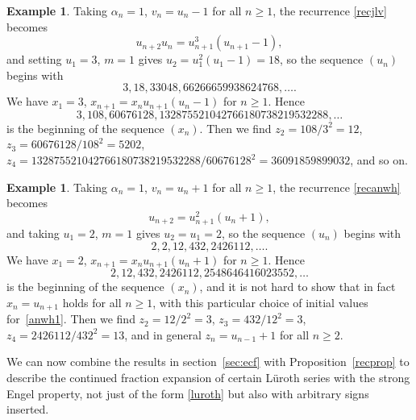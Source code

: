 \documentclass[12pt,a4paper]{amsart}
\theoremstyle{definition}
\newtheorem{example}[theorem]{Example}
\numberwithin{equation}{section}
\newcommand\al{{\alpha}}
\begin{document}
\begin{example}
\label{lur1} 
Taking $\al_n=1$, $v_n=u_n-1$ for all $n\geq 1$, the recurrence \eqref{recjlv} becomes 
\begin{equation} 
\label{jlv1} 
u_{n+2}u_n=u_{n+1}^3 (u_{n+1}-1), 
\end{equation} 
and setting $u_1=3$, $m=1$ gives $u_2=u_1^2(u_1-1) = 18$, so the sequence $(u_n)$ begins with 
\begin{equation}
\label{lurseq} 
3, 18, 33048, 66266659938624768,\ldots . 
\end{equation} 
We have $x_1=3$, $x_{n+1} = x_nu_{n+1}(u_n-1)$ for $n\geq 1$. Hence 
\[ 
3, 108, 60676128, 132875521042766180738219532288,\ldots 
\]
is the beginning of the sequence $(x_n)$. 
Then we find 
$
z_2={108}/{3^2} = 12$, 
$ 
z_3={60676128}/{108^2} = 5202$, 
$
z_4={132875521042766180738219532288}/{60676128^2} = 36091859899032$, 
and so on. 
\end{example} 

\begin{example}
\label{altlur2} 
Taking $\al_n=1$, $v_n=u_n+1$ for all $n\geq 1$, the recurrence \eqref{recanwh} becomes 
\begin{equation} 
\label{anwh1} 
u_{n+2} = u_{n+1}^2 (u_{n}+1), 
\end{equation} 
and taking $u_1=2$, $m=1$ gives $u_2=u_1=2$, so the sequence $(u_n)$ begins with 
\begin{equation}
\label{altlurseq}
2,2,12,432,2426112,\ldots .
\end{equation} 
We have $x_1=2$, $x_{n+1} = x_nu_{n+1}(u_n+1)$ for $n\geq 1$. Hence 
\[ 
2,12,432,2426112,2548646416023552,\ldots 
\]
is the beginning of the sequence $(x_n)$, and it is not hard to 
show that in fact $x_{n} = u_{n+1}$ holds for all $n\geq 1$, with this particular choice of 
initial values for~\eqref{anwh1}. 
Then we find 
$
z_2={12}/{2^2} = 3$, 
$ 
z_3=432/{12^2} = 3$, 
$
z_4={2426112}/{432^2} = 13$, 
and in general $z_n=u_{n-1}+1$ for all $n\geq 2$. 
\end{example} 

We can now combine the results in section~\ref{sec:ecf} with Proposition~\ref{recprop} to describe 
the continued fraction expansion of certain L\"uroth series with the strong 
Engel property, not just of the form \eqref{luroth} but 
also with arbitrary signs inserted. 
\end{document}
